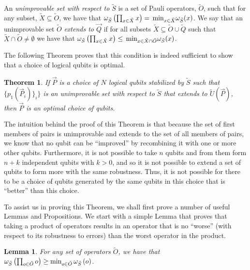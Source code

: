 \documentclass[twocolumn,showpacs,preprintnumbers,amsmath,amssymb,nofootinbib,pra,floatfix]{revtex4-1}
\newtheorem{theorem}{Theorem}
\newtheorem{lemma}{Lemma}
\newenvironment{definition}[1][Definition]{\begin{trivlist}
\item[\hskip \labelsep {\bfseries #1}]}{\end{trivlist}}
\newenvironment{remark}[1][Remark]{\begin{trivlist}
\item[\hskip \labelsep {\bfseries #1}]}{\end{trivlist}}
\newcommand{\lst}{\vec}
\newcommand{\set}{\tilde}
\begin{document}
\begin{definition}
An \emph{unimprovable set with respect to $\set S$} is a set of Pauli operators, $\set O$, such that for any subset, $\set X\subseteq \set O$, we have that $\om_{\set S}\paren{\prod_{x\in \set X} x} = \min_{x\in\set X}\om_{\set S}(x)$.  We say that an unimprovable set $\set O$ \emph{extends to $\lst Q$} if for all subsets $\set X \subseteq \set O\cup\set Q$ such that $\set X\cap \set O \ne \emptyset$ we have that $\om_{\set S}\paren{\prod_{x\in \set X} x} \le \min_{x\in\set X\cap \set O}\om_{\set S}(x)$.
\end{definition}
The following Theorem proves that this condition is indeed sufficient to show that a choice of logical qubits is optimal.
\begin{theorem}
\label{optimality-condition}
If $\lst P$ is a choice of $N$ logical qubits stabilized by $\set S$ such that $\{p_1(\lst P_i)\}_i\}$ is an unimprovable set with respect to $\set S$ that extends to $\set U(\lst P)$, then $\lst P$ is an optimal choice of qubits.
\end{theorem}

\begin{remark}
The intuition behind the proof of this Theorem is that because the set of first members of pairs is unimprovable and extends to the set of all members of pairs, we know that no qubit can be ``improved'' by recombining it with one or more other qubits.  Furthermore, it is not possible to take $n$ qubits and from them form $n+k$ independent qubits with $k>0$, and so it is not possible to extend a set of qubits to form more with the same robustness.  Thus, it is not possible for there to be a choice of qubits generated by the same qubits in this choice that is ``better'' than this choice.

To assist us in proving this Theorem, we shall first prove a number of useful Lemmas and Propositions.  We start with a simple Lemma that proves that taking a product of operators results in an operator that is no ``worse'' (with respect to its robustness to errors) than the worst operator in the product.
\end{remark}
\begin{lemma}
\label{combinations-can't-make-things-worse}
For any set of operators $\set O$, we have that $\om_{\set S}\paren{\prod_{o\in\set O} o} \ge \text{min}_{o\in \set O}\,\om_{\set S}\paren{o}$.
\end{lemma}
\end{document}
